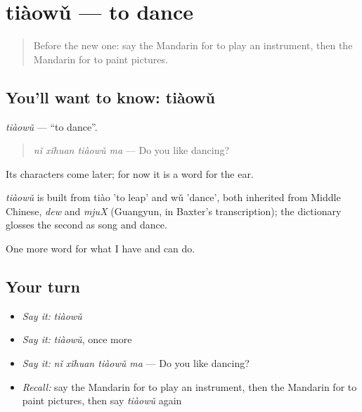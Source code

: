 \section[tiàowǔ]{tiàowǔ — to dance}

\label{lesson:ZH-C110-tiaowu}



\begin{quote}
Before the new one: say the Mandarin for to play an instrument, then the Mandarin for to paint pictures.
\end{quote}

\subsection*{You'll want to know: tiàowǔ}
\emph{tiàowǔ} — \textquotedblleft{}to dance\textquotedblright{}.

\begin{quote}
\emph{nǐ xǐhuan tiàowǔ ma} — Do you like dancing?
\end{quote}

Its characters come later; for now it is a word for the ear.

\begin{cousinweb}
\emph{tiàowǔ} is built from tiào 'to leap' and wǔ 'dance', both inherited from Middle Chinese, \emph{dew} and \emph{mjuX} (Guangyun, in Baxter's transcription); the dictionary glosses the second as song and dance.
\end{cousinweb}

\begin{grammarlens}[title={What you've built}]
One more word for what I have and can do.
\end{grammarlens}

\subsection*{Your turn}
\begin{itemize}
\raggedright
  \item \emph{Say it:} \emph{tiàowǔ}
  \item \emph{Say it:} \emph{tiàowǔ}, once more
  \item \emph{Say it:} \emph{nǐ xǐhuan tiàowǔ ma} — Do you like dancing?
  \item \emph{Recall:} say the Mandarin for to play an instrument, then the Mandarin for to paint pictures, then say \emph{tiàowǔ} again
\end{itemize}

